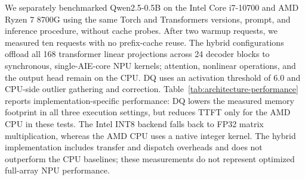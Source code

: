 We separately benchmarked Qwen2.5-0.5B on the Intel Core i7-10700 and AMD Ryzen 7 8700G using the same Torch and Transformers versions, prompt, and inference procedure, without cache probes.
After two warmup requests, we measured ten requests with no prefix-cache reuse.
The hybrid configurations offload all 168 transformer linear projections across 24 decoder blocks to synchronous, single-AIE-core NPU kernels; attention, nonlinear operations, and the output head remain on the CPU.
DQ uses an activation threshold of 6.0 and CPU-side outlier gathering and correction.
Table~\ref{tab:architecture-performance} reports implementation-specific performance: DQ lowers the measured memory footprint in all three execution settings, but reduces TTFT only for the AMD CPU in these tests.
The Intel INT8 backend falls back to FP32 matrix multiplication, whereas the AMD CPU uses a native integer kernel.
The hybrid implementation includes transfer and dispatch overheads and does not outperform the CPU baselines; these measurements do not represent optimized full-array NPU performance.
